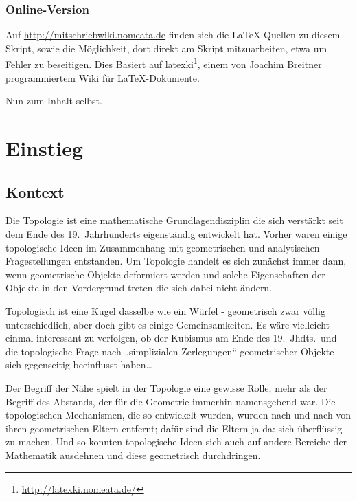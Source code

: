 \documentclass[12pt]{scrbook}   %
\begin{document}
\subsection*{Online-Version}
Auf \url{http://mitschriebwiki.nomeata.de} finden sich die \LaTeX-Quellen zu diesem Skript, sowie die Möglichkeit, dort direkt am Skript mitzuarbeiten, etwa um Fehler zu beseitigen. Dies Basiert auf latexki\footnote{\url{http://latexki.nomeata.de/}}, einem von Joachim Breitner programmiertem Wiki für \LaTeX-Dokumente.

\bigskip

Nun zum Inhalt selbst.

\setcounter{chapter}{0}
\renewcommand{\thechapter}{\Roman{chapter}}
\renewcommand{\theHchapter}{\Roman{chapter}}

\renewcommand{\thesection}{{\rm\bfseries §}\,\thechapter.\arabic{section}}
\renewcommand{\thealles}{\thechapter.\arabic{section}.\arabic{alles}}

\chapter{Einstieg}

\section{Kontext}

Die Topologie ist eine mathematische Grundlagendisziplin die sich verstärkt
seit dem Ende des 19.\ Jahrhunderts eigenständig entwickelt hat. Vorher waren
einige topologische Ideen im Zusammenhang mit geometrischen und analytischen 
Fragestellungen entstanden. Um Topologie handelt es sich zunächst immer dann,
wenn geometrische Objekte deformiert werden und solche Eigenschaften der 
Objekte in den Vordergrund treten die sich dabei nicht ändern. 

Topologisch ist eine Kugel dasselbe wie ein Würfel - geometrisch zwar 
völlig unterschiedlich, aber doch gibt es einige Gemeinsamkeiten. 
Es wäre vielleicht einmal interessant zu verfolgen, ob der Kubismus am Ende
des 19.\ Jhdts.\ und die topologische Frage nach „simplizialen 
Zerlegungen“ geometrischer Objekte sich gegenseitig beeinflusst haben\dots

Der Begriff der Nähe spielt in der Topologie eine gewisse Rolle, mehr als der
Begriff des Abstands, der für die Geometrie immerhin namensgebend war.
Die topologischen 
Mechanismen, die so entwickelt wurden, wurden nach und nach von ihren 
geometrischen Eltern entfernt; dafür sind die Eltern ja da: sich 
überflüssig zu machen. Und so konnten topologische Ideen sich auch auf 
andere Bereiche der Mathematik ausdehnen und diese geometrisch durchdringen.
\end{document}
